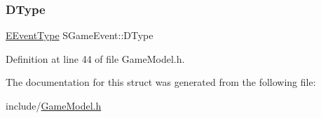 \subsubsection{\texorpdfstring{D\+Type}{DType}}
{\footnotesize\ttfamily \hyperlink{GameModel_8h_abfcf510bafec7c6429906a6ecaac656d}{E\+Event\+Type} S\+Game\+Event\+::\+D\+Type}



Definition at line 44 of file Game\+Model.\+h.



The documentation for this struct was generated from the following file\+:\begin{DoxyCompactItemize}
\item 
include/\hyperlink{GameModel_8h}{Game\+Model.\+h}\end{DoxyCompactItemize}
